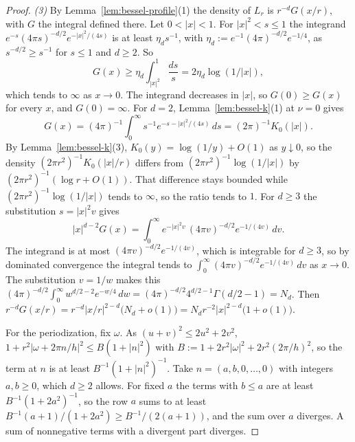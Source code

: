 \begin{proof}
\emph{(3)} By Lemma~\ref{lem:bessel-profile}(1) the density of $L_r$ is $r^{-d}G(x/r)$, with $G$
the integral defined there. Let $0 < |x| < 1$. For $|x|^2 < s \le 1$ the integrand
$e^{-s}(4\pi s)^{-d/2}e^{-|x|^2/(4s)}$ is at least $\eta_ds^{-1}$, with
$\eta_d := e^{-1}(4\pi)^{-d/2}e^{-1/4}$, as $s^{-d/2} \ge s^{-1}$ for $s \le 1$ and $d \ge 2$. So
\[
  G(x) \ge \eta_d\int_{|x|^2}^1 \frac{ds}{s} = 2\eta_d\log(1/|x|) ,
\]
which tends to $\infty$ as $x \to 0$. The integrand decreases in $|x|$, so $G(0) \ge G(x)$ for
every $x$, and $G(0) = \infty$. For $d = 2$, Lemma~\ref{lem:bessel-k}(1) at $\nu = 0$ gives
\[
  G(x) = (4\pi)^{-1}\int_0^\infty s^{-1}e^{-s-|x|^2/(4s)}\,ds = (2\pi)^{-1}K_0(|x|) .
\]
By Lemma~\ref{lem:bessel-k}(3), $K_0(y) = \log(1/y) + O(1)$ as $y \downarrow 0$, so the density
$(2\pi r^2)^{-1}K_0(|x|/r)$ differs from $(2\pi r^2)^{-1}\log(1/|x|)$ by
$(2\pi r^2)^{-1}(\log r + O(1))$. That difference stays bounded while
$(2\pi r^2)^{-1}\log(1/|x|)$ tends to $\infty$, so the ratio tends to $1$. For $d \ge 3$ the
substitution $s = |x|^2v$ gives
\[
  |x|^{d-2}G(x) = \int_0^\infty e^{-|x|^2v}\,(4\pi v)^{-d/2}e^{-1/(4v)}\,dv .
\]
The integrand is at most $(4\pi v)^{-d/2}e^{-1/(4v)}$, which is integrable for $d \ge 3$, so by
dominated convergence the integral tends to $\int_0^\infty (4\pi v)^{-d/2}e^{-1/(4v)}\,dv$ as
$x \to 0$. The substitution $v = 1/w$ makes this
$(4\pi)^{-d/2}\int_0^\infty w^{d/2-2}e^{-w/4}\,dw = (4\pi)^{-d/2}4^{d/2-1}\Gamma(d/2 - 1) = N_d$.
Then $r^{-d}G(x/r) = r^{-d}|x/r|^{2-d}\bigl(N_d + o(1)\bigr)
= N_dr^{-2}|x|^{2-d}\bigl(1 + o(1)\bigr)$.

For the periodization, fix $\omega$. As $(u + v)^2 \le 2u^2 + 2v^2$,
$1 + r^2|\omega + 2\pi n/h|^2 \le B(1 + |n|^2)$ with
$B := 1 + 2r^2|\omega|^2 + 2r^2(2\pi/h)^2$, so the term at $n$ is at least $B^{-1}(1 + |n|^2)^{-1}$.
Take $n = (a, b, 0, \dots, 0)$ with integers $a, b \ge 0$, which $d \ge 2$ allows. For fixed $a$ the terms
with $b \le a$ are at least $B^{-1}(1 + 2a^2)^{-1}$, so the row $a$ sums to at least
$B^{-1}(a + 1)/(1 + 2a^2) \ge B^{-1}/(2(a + 1))$, and the sum over $a$ diverges. A sum of
nonnegative terms with a divergent part diverges.
\end{proof}

